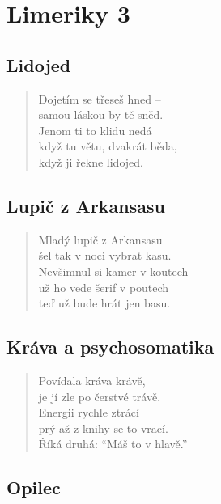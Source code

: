 \section{Limeriky 3}

\begin{multicols}{2}
	
\subsection{Lidojed}
	
\begin{verse}
Dojetím se třeseš hned -- \\
samou láskou by tě sněd.\\
Jenom ti to klidu nedá\\
když tu větu, dvakrát běda,\\
když ji řekne lidojed.
\end{verse}
	
	
\subsection{Lupič z Arkansasu}
	
\begin{verse}
Mladý lupič z Arkansasu \\
šel tak v noci vybrat kasu.\\
Nevšimnul si kamer v koutech\\
už ho vede šerif v poutech\\
teď už bude hrát jen basu.
\end{verse}
	
\subsection{Kráva a psychosomatika}
	
\begin{verse}
Povídala kráva krávě,\\
je jí zle po čerstvé trávě.\\
Energii rychle ztrácí\\
prý až z knihy se to vrací.\\
Říká druhá: “Máš to v hlavě.”
\end{verse}
	
\columnbreak
	
\subsection{Opilec}
	

\end{multicols}
